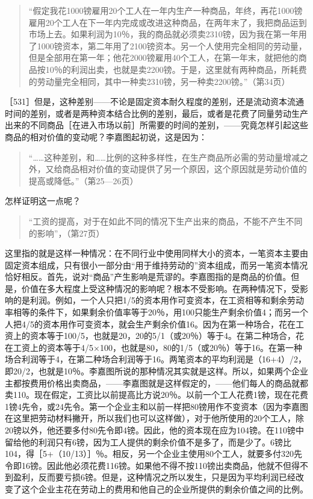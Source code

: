 \begin{quote}{“假定我花1000镑雇用20个工人在一年内生产一种商品，年终，再花1000镑雇用20个工人在下一年内完成或改进这种商品，在两年末了，我把商品运到市场上去。如果利润为10％，我的商品就必须卖2310镑，因为我在第一年用了1000镑资本，第二年用了2100镑资本。另一个人使用完全相同的劳动量，但是全部用在第一年；他花2000镑雇用40个工人，在第一年末，就把他的商品按10％的利润出卖，也就是卖2200镑。于是，这里就有两种商品，所耗费的劳动量完全相同，其中一种卖2310镑，另一种卖2200镑。”（第34页）}\end{quote}

［531］但是，这种差别——不论是固定资本耐久程度的差别，还是流动资本流通时间的差别，或者是两种资本结合比例的差别，最后，或者是花费了同量劳动生产出来的不同商品［在进入市场以前］所需要的时间的差别，——究竟怎样引起这些商品的相对价值的变动呢？李嘉图起初说，这是因为：

\begin{quote}{“……这种差别，和……比例的这种多样性，在生产商品所必需的劳动量增减之外，又给商品相对价值的变动提供了另一个原因，这个原因就是劳动价值的提高或降低。”（第25—26页）}\end{quote}

怎样证明这一点呢？

\begin{quote}{“工资的提高，对于在如此不同的情况下生产出来的商品，不能不产生不同的影响”，（第27页）}\end{quote}

这里指的就是这样一种情况：在不同行业中使用同样大小的资本，一笔资本主要由固定资本组成，只有很小一部分由“用于维持劳动的”资本组成，而另一笔资本情况恰好相反。首先，说对“商品”产生影响是荒谬的。李嘉图指的是商品的价值。但是，价值在多大程度上受这种情况的影响呢？根本不受影响。在两种情况下，受影响的是利润。例如，一个人只把1/5的资本用作可变资本，在工资相等和剩余劳动率相等的条件下，如果剩余价值率等于20％，用100只能生产剩余价值4；而另一个人把4/5的资本用作可变资本，就会生产剩余价值16。因为在第一种场合，花在工资上的资本等于100/5，也就是20，20的5/1（或20％）等于4。在第二种场合，花在工资上的资本等于4/5×100，也就是80，80的1/5（或20％）等于16。在第一种场合利润等于4，在第二种场合利润等于16。两笔资本的平均利润是（16+4）/2，即20/2，也就是10％。李嘉图所说的那种情况其实就是这样。所以，如果两个企业主都按费用价格出卖商品，——李嘉图就是这样假定的，——他们每人的商品就都卖110。现在假定，工资比以前提高比方说20％。以前一个工人花费1镑，现在花费1镑4先令，或24先令。第一个企业主和以前一样把80镑用作不变资本（因为李嘉图在这里把劳动材料撇开，所以我们也可以这样做），对于他所使用的20个工人，除20镑以外，他还要多付80先令即4镑。因此，他的资本现在应为104镑。在110镑中留给他的利润只有6镑，因为工人提供的剩余价值不是多了，而是少了。6镑比104，得［5+（10/13）］％。相反，另一个企业主使用80个工人，就要多付320先令即16镑。因此他必须花费116镑。如果他不得不按110镑出卖商品，他就不但得不到盈利，反而要亏损6镑。但是，这种情况之所以发生，只是因为平均利润已经改变了这个企业主花在劳动上的费用和他自己的企业所提供的剩余价值之间的比例。

